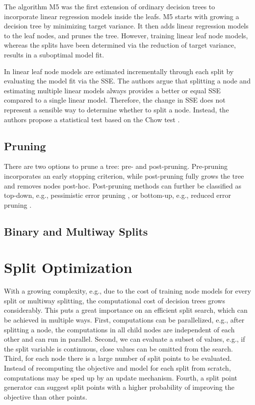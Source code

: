 \documentclass[a4paper, 11pt]{article}
\begin{document}
The algorithm M5 \cite{quinlan_model_tree} was the first extension of ordinary decision trees to incorporate linear regression models inside the leafs.
M5 starts with growing a decision tree by minimizing target variance. It then adds linear regression models to the leaf nodes, and prunes the tree. However, training linear leaf node models, whereas the splits have been determined via the reduction of target variance, results in a suboptimal model fit.
\par
In \cite{potts_incremental_model_tree} linear leaf node models are estimated incrementally through each split by evaluating the model fit via the SSE. The authors argue that splitting a node and estimating multiple linear models always provides a better or equal SSE compared to a single linear model. Therefore, the change in SSE does not represent a sensible way to determine whether to split a node.
Instead, the authors propose a statistical test based on the Chow test \cite{chow_inequality_test}.

\subsection{Pruning}

There are two options to prune a tree: pre- and post-pruning. Pre-pruning incorporates an early stopping criterion, while post-pruning fully grows the tree and removes nodes post-hoc. Post-pruning methods can further be classified as top-down, e.g., pessimistic error pruning \cite{quinlan_simplifying}, or bottom-up, e.g., reduced error pruning \cite{quinlan_simplifying}.

\subsection{Binary and Multiway Splits}

\section{Split Optimization}

With a growing complexity, e.g., due to the cost of training node models for every split or multiway splitting, the computational cost of decision trees grows considerably. This puts a great importance on an efficient split search, which can be achieved in multiple ways.
First, computations can be parallelized, e.g., after splitting a node, the computations in all child nodes are independent of each other and can run in parallel.
Second, we can evaluate a subset of values, e.g., if the split variable is continuous, close values can be omitted from the search.
Third, for each node there is a large number of split points to be evaluated. Instead of recomputing the objective and model for each split from scratch, computations may be sped up by an update mechanism. Fourth, a split point generator can suggest split points with a higher probability of improving the objective than other points.
\end{document}
